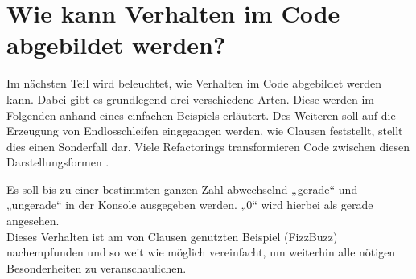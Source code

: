 \chapter{Wie kann Verhalten im Code abgebildet werden?}
Im nächsten Teil wird beleuchtet, wie Verhalten im Code abgebildet werden kann. Dabei gibt es grundlegend drei verschiedene Arten. 
Diese werden im Folgenden anhand eines einfachen Beispiels erläutert. 
Des Weiteren soll auf die Erzeugung von Endlosschleifen eingegangen werden, wie Clausen feststellt, stellt dies einen Sonderfall dar.
Viele Refactorings transformieren Code zwischen diesen Darstellungsformen \citep[S. 313]{fiveLines.2023}.
\begin{tcolorbox}[colback=gray!20!white, colframe=gray!75!black, title=Beispiel-Verhalten]
    Es soll bis zu einer bestimmten ganzen Zahl abwechselnd „gerade“ und „ungerade“ in der Konsole ausgegeben werden. „0“ wird hierbei als gerade angesehen.\\
    Dieses Verhalten ist am von Clausen genutzten Beispiel (FizzBuzz) nachempfunden und so weit wie möglich vereinfacht, um weiterhin alle nötigen Besonderheiten zu veranschaulichen.\cite{fiveLines.2023}
\end{tcolorbox}

